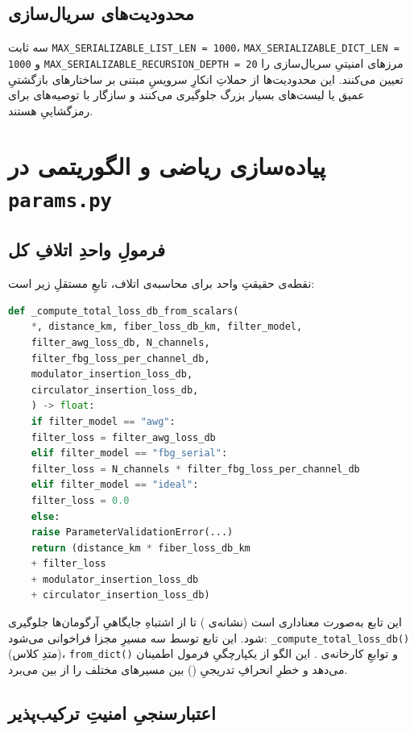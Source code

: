 \subsection{محدودیت‌های سریال‌سازی}

سه ثابت \texttt{MAX\_SERIALIZABLE\_LIST\_LEN = 1000}، \texttt{MAX\_SERIALIZABLE\_DICT\_LEN = 1000} و \texttt{MAX\_SERIALIZABLE\_RECURSION\_DEPTH = 20} مرزهای امنیتیِ سریال‌سازی را تعیین می‌کنند. این محدودیت‌ها از حملاتِ انکارِ سرویسِ مبتنی بر ساختارهای بازگشتیِ عمیق یا لیست‌های بسیار بزرگ جلوگیری می‌کنند و سازگار با توصیه‌های  برای رمزگشاییِ  هستند.

\section{پیاده‌سازی ریاضی و الگوریتمی در \texttt{params.py}}

\subsection{فرمولِ واحدِ اتلافِ کل}

نقطه‌ی حقیقتِ واحد برای محاسبه‌ی اتلاف، تابعِ مستقلِ زیر است:

\begin{lstlisting}[language=Python]
	def _compute_total_loss_db_from_scalars(
	*, distance_km, fiber_loss_db_km, filter_model,
	filter_awg_loss_db, N_channels,
	filter_fbg_loss_per_channel_db,
	modulator_insertion_loss_db,
	circulator_insertion_loss_db,
	) -> float:
	if filter_model == "awg":
	filter_loss = filter_awg_loss_db
	elif filter_model == "fbg_serial":
	filter_loss = N_channels * filter_fbg_loss_per_channel_db
	elif filter_model == "ideal":
	filter_loss = 0.0
	else:
	raise ParameterValidationError(...)
	return (distance_km * fiber_loss_db_km
	+ filter_loss
	+ modulator_insertion_loss_db
	+ circulator_insertion_loss_db)
\end{lstlisting}

این تابع به‌صورت معناداری  است (نشانه‌ی \lr{\texttt{*}}) تا از اشتباهِ جایگاهیِ آرگومان‌ها جلوگیری شود. این تابع توسط سه مسیرِ مجزا فراخوانی می‌شود: \texttt{\_compute\_total\_loss\_db()} (متدِ کلاس)، \texttt{from\_dict()} و توابعِ کارخانه‌ی . این الگو از یکپارچگیِ فرمول اطمینان می‌دهد و خطرِ انحرافِ تدریجیِ () بین مسیرهای مختلف را از بین می‌برد.

\subsection{اعتبارسنجیِ امنیتِ ترکیب‌پذیر}

